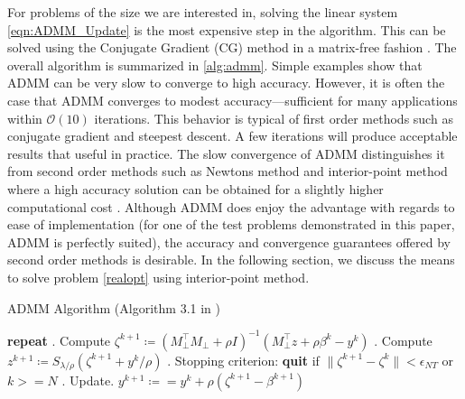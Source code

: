 \documentclass[final,onefignum,onetabnum]{siamart190516}
\newcounter{example}
\begin{document}
For problems of the size we are interested in, solving the linear system \eqref{eqn:ADMM_Update} is the most expensive step in the algorithm. This can be solved using the Conjugate Gradient (CG) method in a matrix-free fashion \cite{saad2003iterative}. The overall algorithm is summarized in \ref{alg:admm}. Simple examples show that ADMM can be very slow to converge to high accuracy. However, it is often the case that ADMM converges to modest accuracy—sufficient for many applications within $\mathcal{O}(10)$ iterations. This behavior is typical of first order methods such as conjugate gradient and steepest descent. A few iterations will produce acceptable results that useful in practice. The slow convergence of ADMM distinguishes it from second order methods such as Newtons method and interior-point method where a high accuracy solution can be obtained for a slightly higher computational cost \cite{boyd2011distributed}. Although ADMM does enjoy the advantage with regards to ease of implementation (for one of the test problems demonstrated in this paper, ADMM is perfectly suited), the accuracy and convergence guarantees offered by second order methods is desirable. In the following section, we discuss the means to solve problem \eqref{realopt} using interior-point method.

\begin{algorithm}[H]
\caption{ADMM Algorithm (Algorithm 3.1 in \cite{boyd2011distributed})}
\label{alg:admm}
\begin{algorithmic}
\STATE \textbf{repeat}
. Compute $\zeta^{k+1} \coloneqq \left(M_{\perp}^{\top} M_{\perp} +\rho I\right)^{-1}\left(M_{\perp}^{\top} z+\rho \beta^{k}-y^{k}\right)$
. Compute $z^{k+1} \coloneqq S_{\lambda / \rho}\left(\zeta^{k+1}+y^{k} / \rho\right)$
. Stopping criterion: \textbf{quit} if $\|\zeta^{k+1} - \zeta^{k} \| <\epsilon_{NT}$ or $k >= N$
. Update. $y^{k+1} \coloneqq =y^{k}+\rho\left(\zeta^{k+1}-\beta^{k+1}\right)$
\end{algorithmic}
\end{algorithm}

\end{document}
